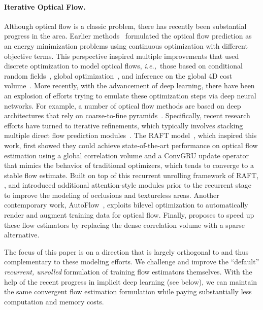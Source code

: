 \documentclass[10pt,twocolumn,letterpaper]{article}
\def\ie{\textit{i.e.,~}}
\begin{document}
\paragraph{Iterative Optical Flow.} Although optical flow is a classic problem, there has recently been substantial progress in the area.
Earlier methods~\cite{horn1981determining,black1993framework,Zach2007ADB,Wedel2008AnIA,Brox2011LargeDO} formulated the optical flow prediction as an energy minimization problems using continuous optimization with different objective terms. This perspective inspired multiple improvements that used discrete optimization to model optical flows, \ie those based on conditional random fields~\cite{Menze2015DiscreteOF}, global optimization~\cite{Chen2016FullFO}, and inference on the global 4D cost volume~\cite{Xu2017AccurateOF}. 
More recently, with the advancement of deep learning, there have been an explosion of efforts trying to emulate these optimization steps via deep neural networks. For example, a number of optical flow methods are based on deep architectures that rely on coarse-to-fine pyramids~\cite{pwcnet,pwcnet+,liteflownet,liteflownet2,flownet,ilg2017flownet,vcn}. Specifically, recent research efforts have turned to iterative refinements, which typically involves stacking multiple direct flow prediction modules~\cite{ilg2017flownet,ranjan2017optical}. The RAFT model~\cite{RAFT}, which inspired this work, first showed they could achieve state-of-the-art performance on optical flow estimation using a global correlation volume and a ConvGRU update operator that mimics the behavior of traditional optimizers, which tends to converge to a stable flow estimate. Built on top of this recurrent unrolling framework of RAFT, \citet{GMA}, and \citet{Zhang2021SepFlow} introduced additional attention-style modules prior to the recurrent stage to improve the modeling of occlusions and textureless areas. Another contemporary work, AutoFlow~\cite{autoflow}, exploits bilevel optimization to automatically render and augment training data for optical flow. Finally, \citet{jiang2021learning} proposes to speed up these flow estimators by replacing the dense correlation volume with a sparse alternative.

The focus of this paper is on a direction that is largely orthogonal to and thus complementary to these modeling efforts. We challenge and improve the ``default'' \emph{recurrent, unrolled} formulation of training flow estimators themselves. With the help of the recent progress in implicit deep learning (see below), we can maintain the same convergent flow estimation formulation while paying substantially less computation and memory costs.
\end{document}
